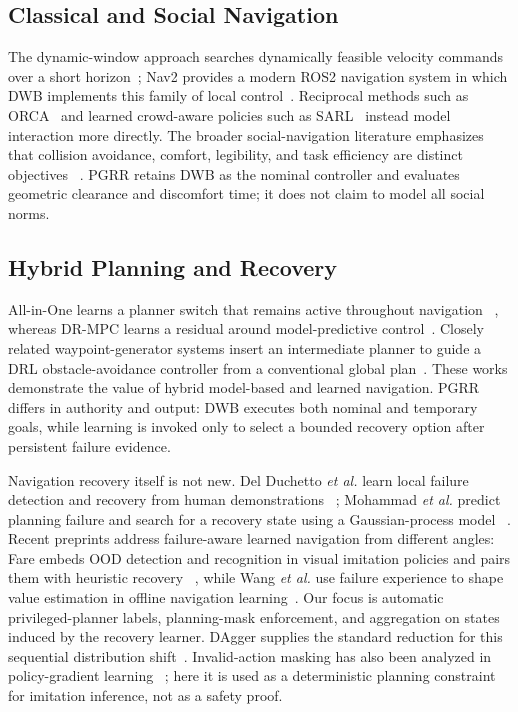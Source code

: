 \subsection{Classical and Social Navigation}
The dynamic-window approach searches dynamically feasible velocity commands over
a short horizon~\cite{fox1997dwa}; Nav2 provides a modern ROS2 navigation
system in which DWB implements this family of local control~\cite{macenski2020marathon2}.
Reciprocal methods such as ORCA~\cite{vandenberg2011orca} and learned crowd-aware
policies such as SARL~\cite{chen2019sarl} instead model interaction more directly.
The broader social-navigation literature emphasizes that collision avoidance,
comfort, legibility, and task efficiency are distinct objectives
~\cite{mavrogiannis2023survey}.  PGRR retains DWB as the nominal
controller and evaluates geometric clearance and discomfort time; it does not
claim to model all social norms.

\subsection{Hybrid Planning and Recovery}
All-in-One learns a planner switch that remains active throughout navigation
~\cite{kastner2021allinone}, whereas DR-MPC learns a residual around model-predictive
control~\cite{han2024drmpc}.  Closely related waypoint-generator systems insert
an intermediate planner to guide a DRL obstacle-avoidance controller from a
conventional global plan~\cite{kastner2021waypoints}.  These works demonstrate
the value of hybrid model-based and learned navigation.  PGRR differs in
authority and output: DWB executes both nominal and temporary goals, while
learning is invoked only to select a bounded recovery option after persistent
failure evidence.

Navigation recovery itself is not new.  Del Duchetto \emph{et al.} learn local
failure detection and recovery from human demonstrations
~\cite{delduchetto2018recovery}; Mohammad \emph{et al.} predict planning failure
and search for a recovery state using a Gaussian-process model
~\cite{mohammad2024gprecovery}.  Recent preprints address failure-aware learned
navigation from different angles: Fare embeds OOD detection and recognition in
visual imitation policies and pairs them with heuristic recovery
~\cite{wang2025fare}, while Wang \emph{et al.} use failure experience to shape
value estimation in offline navigation learning~\cite{wang2026failureaware}.
Our focus is automatic privileged-planner labels, planning-mask enforcement,
and aggregation on states induced by the recovery learner.  DAgger supplies the
standard reduction for this sequential distribution shift~\cite{ross2011dagger}.
Invalid-action masking has also been analyzed in policy-gradient learning
~\cite{huang2022invalidmasking}; here it is used as a deterministic planning
constraint for imitation inference, not as a safety proof.

